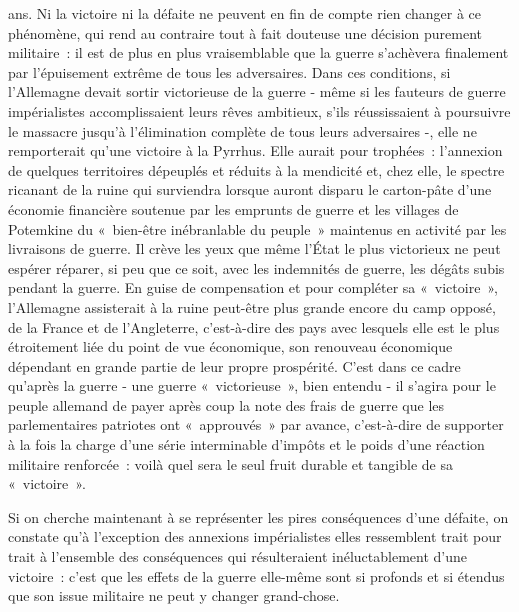 \documentclass[french,twoside]{book} %
\begin{document}
ans. Ni la victoire ni la défaite ne peuvent en fin de compte rien changer à ce phénomène, qui rend au contraire tout à fait douteuse une décision purement militaire : il est de plus en plus vraisemblable que la guerre s’achèvera finalement par l’épuisement extrême de tous les adversaires. Dans ces conditions, si l’Allemagne devait sortir victorieuse de la guerre - même si les fauteurs de guerre impérialistes accomplissaient leurs rêves ambitieux, s’ils réussissaient à poursuivre le massacre jusqu’à l’élimination complète de tous leurs adversaires -, elle ne remporterait qu’une victoire à la Pyrrhus. Elle aurait pour trophées : l’annexion de quelques territoires dépeuplés et réduits à la mendicité et, chez elle, le spectre ricanant de la ruine qui surviendra lorsque auront disparu le carton-pâte d’une économie financière soutenue par les emprunts de guerre et les villages de Potemkine du « bien-être inébranlable du peuple » maintenus en activité par les livraisons de guerre. Il crève les yeux que même l’État le plus victorieux ne peut espérer réparer, si peu que ce soit, avec les indemnités de guerre, les dégâts subis pendant la guerre. En guise de compensation et pour compléter sa « victoire », l’Allemagne assisterait à la ruine peut-être plus grande encore du camp opposé, de la France et de l’Angleterre, c’est-à-dire des pays avec lesquels elle est le plus étroitement liée du point de vue économique, son renouveau économique dépendant en grande partie de leur propre prospérité. C'est dans ce cadre qu’après la guerre - une guerre « victorieuse », bien entendu - il s’agira pour le peuple allemand de payer après coup la note des frais de guerre que les parlementaires patriotes ont « approuvés » par avance, c’est-à-dire de supporter à la fois la charge d’une série interminable d’impôts et le poids d’une réaction militaire renforcée : voilà quel sera le seul fruit durable et tangible de sa « victoire ».\par
  Si on cherche maintenant à se représenter les pires conséquences d’une défaite, on constate qu’à l’exception des annexions impérialistes elles ressemblent trait pour trait à l’ensemble des conséquences qui résulteraient inéluctablement d’une victoire : c’est que les effets de la guerre elle-même sont si profonds et si étendus que son issue militaire ne peut y changer grand-chose.\par
\end{document}
